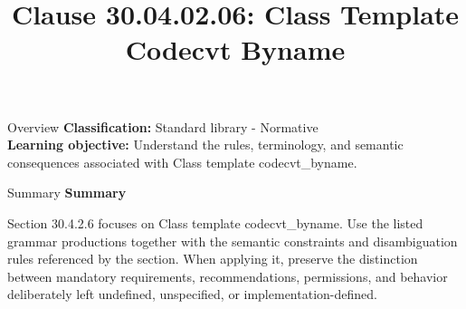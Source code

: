 \documentclass[10pt,letterpaper]{article}
\title{Clause 30.04.02.06: Class Template Codecvt Byname}
\author{}
\date{}
\begin{document}
\maketitle
\begin{CornellOverviewBox}{Overview}
\textbf{Classification:} Standard library - Normative\\[2pt]
\textbf{Learning objective:} Understand the rules, terminology, and semantic consequences associated with Class template codecvt\_byname.
\end{CornellOverviewBox}\begin{CornellSummaryBox}{Summary}
{\sffamily\bfseries\color{Accent} Summary}\par\vspace{3pt}Section 30.4.2.6 focuses on Class template codecvt\_byname. Use the listed grammar productions together with the semantic constraints and disambiguation rules referenced by the section. When applying it, preserve the distinction between mandatory requirements, recommendations, permissions, and behavior deliberately left undefined, unspecified, or implementation-defined.
\end{CornellSummaryBox}
\end{document}

